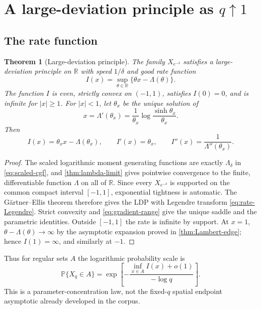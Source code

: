 \documentclass[11pt,a4paper]{article}
\newtheorem{theorem}{Theorem}[section]
\theoremstyle{definition}
\newcommand{\R}{\mathbb{R}}
\newcommand{\Pp}{\mathbb{P}}
\newcommand{\1}{\mathbf{1}}
\begin{document}
\section{A large-deviation principle as \texorpdfstring{$q\uparrow1$}{q tends to 1}}
\label{sec:LDP}

\subsection{The rate function}

\begin{theorem}[Large-deviation principle]
\label{thm:LDP}
The family $X_{e^{-\delta}}$ satisfies a large-deviation principle on $\R$
with speed $1/\delta$ and good rate function
\begin{equation}
 I(x)=\sup_{\theta\in\R}\{\theta x-\Lambda(\theta)\}.
 \label{eq:rate-Legendre}
\end{equation}
The function $I$ is even, strictly convex on $(-1,1)$, satisfies $I(0)=0$,
and is infinite for $|x|\ge1$.  For $|x|<1$, let $\theta_x$ be the unique
solution of
\begin{equation}
 x=\Lambda'(\theta_x)
 =\frac1{\theta_x}\log\frac{\sinh\theta_x}{\theta_x}.
 \label{eq:saddle-equation}
\end{equation}
Then
\begin{equation}
 I(x)=\theta_xx-\Lambda(\theta_x),
 \qquad I'(x)=\theta_x,
 \qquad I''(x)=\frac1{\Lambda''(\theta_x)}.
 \label{eq:rate-parametric}
\end{equation}
\end{theorem}

\begin{proof}
The scaled logarithmic moment generating functions are exactly
$\Lambda_\delta$ in \eqref{eq:scaled-cgf}, and
\cref{thm:lambda-limit} gives pointwise convergence to the finite,
differentiable function $\Lambda$ on all of $\R$.  Since every
$X_{e^{-\delta}}$ is supported on the common compact interval $[-1,1]$,
exponential tightness is automatic.  The G\"artner--Ellis theorem \cite{Ellis1984,DemboZeitouni} therefore
gives the LDP with Legendre transform \eqref{eq:rate-Legendre}.  Strict
convexity and \eqref{eq:gradient-range} give the unique saddle and the
parametric identities.  Outside $[-1,1]$ the rate is infinite by support.
At $x=1$,
$\theta-\Lambda(\theta)\to\infty$ by the asymptotic expansion proved in
\cref{thm:Lambert-edge}; hence $I(1)=\infty$, and similarly at $-1$.
\end{proof}

Thus for regular sets $A$ the logarithmic probability scale is
\begin{equation}
 \Pp\{X_q\in A\}
 =\exp\left[-\frac{\inf_{x\in A}I(x)+o(1)}{-\log q}\right].
 \label{eq:LDP-heuristic}
\end{equation}
This is a parameter-concentration law, not the fixed-$q$ spatial endpoint
asymptotic already developed in the corpus.
\end{document}
